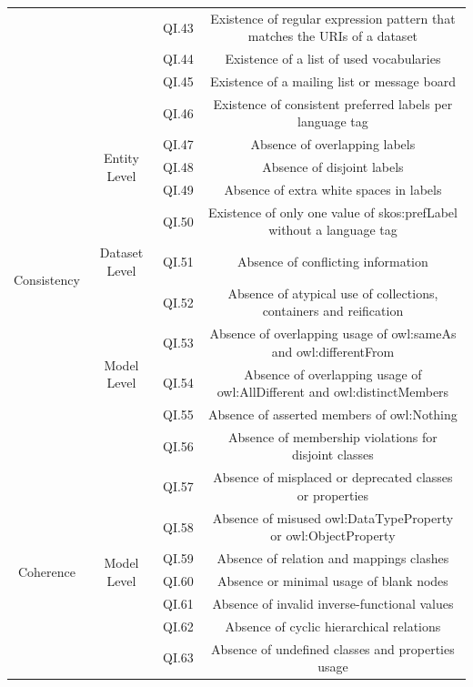 \documentclass[onecolumn, crcready]{iosart2c}
\begin{document}
\begin{landscape}
\begin{center}
{\begin{longtable}[h]{|c|c|c|c|}
\cline{3-4}
 &  & QI.43 & Existence of regular expression pattern that matches the URIs of a dataset \cite{Framework2012}\tabularnewline
\cline{3-4}
 &  & QI.44 & Existence of a list of used vocabularies \tabularnewline
\cline{3-4}
 &  & QI.45 & Existence of a mailing list or message board \cite{flemming2010}\tabularnewline
\hline
\multirow{11}{*}{Consistency} & \multirow{5}{*}{Entity Level} & QI.46 & Existence of consistent preferred labels per language tag \cite{skosprimer}\cite{Mader2012}\tabularnewline
\cline{3-4}
 &  & QI.47 & Absence of overlapping labels\tabularnewline
\cline{3-4}
 &  & QI.48 & Absence of disjoint labels \cite{Mader2012}\tabularnewline
\cline{3-4}
 &  & QI.49 & Absence of extra white spaces in labels \cite{Suominen:2012:IQS:2413941.2413985}\tabularnewline
\cline{3-4}
 &  & QI.50 & Existence of only one value of skos:prefLabel without a language tag  \cite{Mader2012}\cite{Suominen:2012:IQS:2413941.2413985}\tabularnewline
\cline{2-4}
 & \multirow{1}{*}{Dataset Level} & QI.51 & Absence of conflicting information \cite{Mendes2012}\tabularnewline
\cline{2-4}
 & \multirow{5}{*}{Model Level} & QI.52 & Absence of atypical use of collections, containers and reification \cite{Hogan2010}\tabularnewline
\cline{3-4}
 &  & QI.53 & Absence of overlapping usage of owl:sameAs and owl:differentFrom  \cite{Hogan2010}\tabularnewline
\cline{3-4}
 &  & QI.54 & Absence of overlapping usage of owl:AllDifferent and owl:distinctMembers  \cite{Hogan2010}\tabularnewline
\cline{3-4}
 &  & QI.55 & Absence of asserted members of owl:Nothing  \cite{Hogan2010}\tabularnewline
\cline{3-4}
 &  & QI.56 & Absence of membership violations for disjoint classes  \cite{Hogan2010}\tabularnewline
\hline
\hline
\multirow{10}{*}{Coherence} & \multirow{10}{*}{Model Level} & QI.57 & Absence of misplaced or deprecated classes or properties  \cite{Hogan2010}\tabularnewline
\cline{3-4}
 &  & QI.58 & Absence of misused owl:DataTypeProperty or owl:ObjectProperty  \cite{Hogan2010}\tabularnewline
\cline{3-4}
 &  & QI.59 & Absence of relation and mappings clashes  \cite{Suominen:2012:IQS:2413941.2413985}\tabularnewline
\cline{3-4}
 &  & QI.60 & Absence or minimal usage of blank nodes \cite{Hogan:2012:ESL:2263498.2264570}\tabularnewline
\cline{3-4}
 &  & QI.61 & Absence of invalid inverse-functional values \cite{Hogan2010}\tabularnewline
\cline{3-4}
 &  & QI.62 & Absence of cyclic hierarchical relations \cite{conf/jcdl/Soergel05}\cite{Suominen:2012:IQS:2413941.2413985}\cite{Mader2012}\tabularnewline
\cline{3-4}
 &  & QI.63 & Absence of undefined classes and properties usage \cite{Hogan2010}\tabularnewline

\end{longtable}}
\end{center}
\end{landscape}
\end{document}
